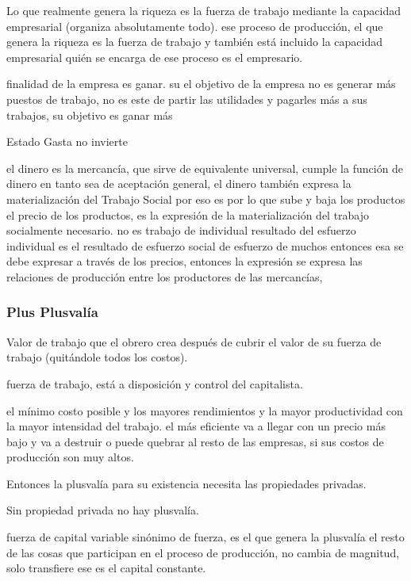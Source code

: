 \documentclass[
  a4paper,
]{article}
\begin{document}
Lo que realmente genera la riqueza es la fuerza de trabajo mediante la
capacidad empresarial (organiza absolutamente todo). ese proceso de
producción, el que genera la riqueza es la fuerza de trabajo y también
está incluido la capacidad empresarial quién se encarga de ese proceso
es el empresario.

finalidad de la empresa es ganar. su el objetivo de la empresa no es
generar más puestos de trabajo, no es este de partir las utilidades y
pagarles más a sus trabajos, su objetivo es ganar más

Estado Gasta no invierte

el dinero es la mercancía, que sirve de equivalente universal, cumple la
función de dinero en tanto sea de aceptación general, el dinero también
expresa la materialización del Trabajo Social por eso es por lo que sube
y baja los productos el precio de los productos, es la expresión de la
materialización del trabajo socialmente necesario. no es trabajo de
individual resultado del esfuerzo individual es el resultado de esfuerzo
social de esfuerzo de muchos entonces esa se debe expresar a través de
los precios, entonces la expresión se expresa las relaciones de
producción entre los productores de las mercancías,

\hypertarget{plus-plusvaluxeda}{%
\subsubsection{Plus Plusvalía}\label{plus-plusvaluxeda}}

Valor de trabajo que el obrero crea después de cubrir el valor de su
fuerza de trabajo (quitándole todos los costos).

fuerza de trabajo, está a disposición y control del capitalista.

el mínimo costo posible y los mayores rendimientos y la mayor
productividad con la mayor intensidad del trabajo. el más eficiente va a
llegar con un precio más bajo y va a destruir o puede quebrar al resto
de las empresas, si sus costos de producción son muy altos.

Entonces la plusvalía para su existencia necesita las propiedades
privadas.

Sin propiedad privada no hay plusvalía.

fuerza de capital variable sinónimo de fuerza, es el que genera la
plusvalía el resto de las cosas que participan en el proceso de
producción, no cambia de magnitud, solo transfiere ese es el capital
constante.
\end{document}
